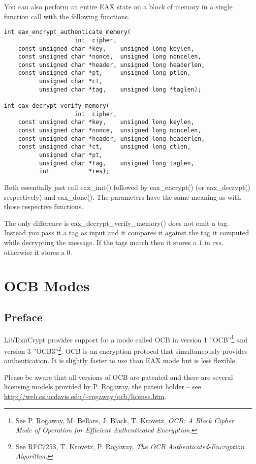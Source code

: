 \documentclass[synpaper]{book}
\newcommand{\mysection}[1]    %
	{                   %
	\section{#1}
   \markboth{\textsf{www.libtom.net}}{\thesection ~ {#1}}
	}
\begin{document}
You can also perform an entire EAX state on a block of memory in a single function call with the
following functions.


 
\begin{verbatim}
int eax_encrypt_authenticate_memory(
                    int  cipher,
    const unsigned char *key,    unsigned long keylen,
    const unsigned char *nonce,  unsigned long noncelen,
    const unsigned char *header, unsigned long headerlen,
    const unsigned char *pt,     unsigned long ptlen,
          unsigned char *ct,
          unsigned char *tag,    unsigned long *taglen);

int eax_decrypt_verify_memory(
                    int  cipher,
    const unsigned char *key,    unsigned long keylen,
    const unsigned char *nonce,  unsigned long noncelen,
    const unsigned char *header, unsigned long headerlen,
    const unsigned char *ct,     unsigned long ctlen,
          unsigned char *pt,
          unsigned char *tag,    unsigned long taglen,
          int           *res);
\end{verbatim}

Both essentially just call eax\_init() followed by eax\_encrypt() (or eax\_decrypt() respectively) and eax\_done().  The parameters
have the same meaning as with those respective functions.

The only difference is eax\_decrypt\_verify\_memory() does not emit a tag.  Instead you pass it a tag as input and it compares it against
the tag it computed while decrypting the message.  If the tags match then it stores a $1$ in \textit{res}, otherwise it stores a $0$.

\mysection{OCB Modes}
\subsection{Preface}

LibTomCrypt provides support for a mode called OCB in version 1 ''OCB''\footnote{See
P. Rogaway, M. Bellare, J. Black, T. Krovetz, \textit{OCB: A Block Cipher Mode of Operation for Efficient Authenticated Encryption}.}
and version 3 ''OCB3''\footnote{See RFC7253, T. Krovetz, P. Rogaway, \textit{The OCB Authenticated-Encryption Algorithm}.}.
OCB is an encryption protocol that simultaneously provides authentication.  It is slightly faster to use than EAX mode
but is less flexible.

Please be aware that all versions of OCB are patented and there are several licensing models provided by P. Rogaway, the patent holder
-- see \url{http://web.cs.ucdavis.edu/~rogaway/ocb/license.htm}.
\end{document}
